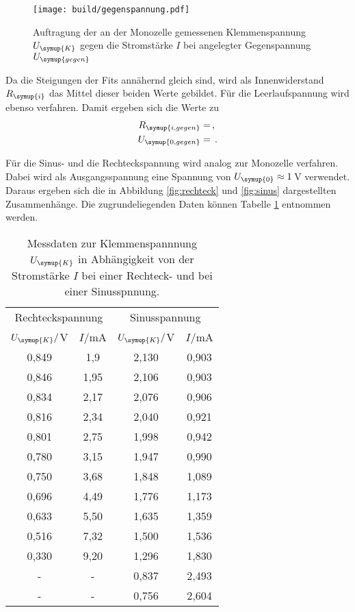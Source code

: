 \begin{figure}
  \centering
  \texttt{[image: build/gegenspannung.pdf]}
  \caption{Auftragung der an der Monozelle gemessenen Klemmenspannung $U_{\symup{K}}$
  gegen die Stromstärke $I$ bei angelegter Gegenspannung $U_{\symup{gegen}}$ }
  \label{fig:gegenspannung}
\end{figure}

Da die Steigungen der Fits annähernd gleich sind, wird als Innenwiderstand $R_{\symup{i}}$
das Mittel dieser beiden Werte gebildet. Für die Leerlaufspannung wird ebenso verfahren.
Damit ergeben sich die Werte zu
\begin{align}
  R_{\symup{i,gegen}}&= \,,\\
  U_{\symup{0,gegen}}&= \,.
\end{align}

Für die Sinus- und die Rechteckspannung wird analog zur Monozelle verfahren. Dabei
wird als Ausgangsspannung eine Spannung von $U_{\symup{0}}\approx1$\,V verwendet.
Daraus ergeben sich die in Abbildung \ref{fig:rechteck} und \ref{fig:sinus} dargestellten
Zusammenhänge. Die zugrundeliegenden Daten können Tabelle \ref{tab:re_sin} entnommen
werden.

\begin{table}
  \centering
  \caption{Messdaten zur Klemmenspannnung $U_{\symup{K}}$ in Abhängigkeit von der
  Stromstärke $I$ bei einer Rechteck- und bei einer Sinusspnnung.}
  \label{tab:re_sin}
  \begin{tabular}{c c c c}
    \hline
    \multicolumn{2}{c}{Rechteckspannung} & \multicolumn{2}{c}{Sinusspannung} \\
    \cmidrule(lr){1-2}
    \cmidrule(lr){3-4}
    $U_{\symup{K}}/$V & $I/$mA & $U_{\symup{K}}/$V & $I/$mA \\
    \midrule
    0,849 &	1,9   & 2,130 	& 0,903 \\
    0,846	& 1,95  & 2,106	  & 0,903 \\
    0,834	& 2,17  & 2,076 	& 0,906 \\
    0,816	& 2,34  & 2,040 	& 0,921 \\
    0,801	& 2,75  & 1,998	  & 0,942 \\
    0,780	& 3,15  & 1,947	  & 0,990 \\
    0,750	& 3,68  & 1,848	  & 1,089 \\
    0,696	& 4,49  & 1,776	  & 1,173 \\
    0,633	& 5,50  & 1,635	  & 1,359 \\
    0,516	& 7,32  & 1,500	  & 1,536 \\
    0,330	& 9,20  & 1,296	  & 1,830 \\
    -     & -     & 0,837	  & 2,493 \\
    -     & -     & 0,756	  & 2,604 \\
    \bottomrule
  \end{tabular}
\end{table}

